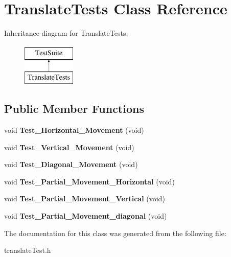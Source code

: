 \hypertarget{classTranslateTests}{\section{Translate\-Tests Class Reference}
\label{classTranslateTests}
}
Inheritance diagram for Translate\-Tests\-:\begin{figure}[H]
\begin{center}
\leavevmode
\includegraphics[height=2.000000cm]{classTranslateTests}
\end{center}
\end{figure}
\subsection*{Public Member Functions}
\begin{DoxyCompactItemize}
\item 
\hypertarget{classTranslateTests_a5b11486e0e2a66a30702efe88887eb25}{void {\bfseries Test\-\_\-\-Horizontal\-\_\-\-Movement} (void)}\label{classTranslateTests_a5b11486e0e2a66a30702efe88887eb25}

\item 
\hypertarget{classTranslateTests_a293553c0aed293861dd2860bb21277df}{void {\bfseries Test\-\_\-\-Vertical\-\_\-\-Movement} (void)}\label{classTranslateTests_a293553c0aed293861dd2860bb21277df}

\item 
\hypertarget{classTranslateTests_ae9bbcf02dc34b465790a61313ef8d872}{void {\bfseries Test\-\_\-\-Diagonal\-\_\-\-Movement} (void)}\label{classTranslateTests_ae9bbcf02dc34b465790a61313ef8d872}

\item 
\hypertarget{classTranslateTests_a4267680ef9db14133c0840c028d42a7c}{void {\bfseries Test\-\_\-\-Partial\-\_\-\-Movement\-\_\-\-Horizontal} (void)}\label{classTranslateTests_a4267680ef9db14133c0840c028d42a7c}

\item 
\hypertarget{classTranslateTests_ac50349be30fc6521f2980f5d2fe4566d}{void {\bfseries Test\-\_\-\-Partial\-\_\-\-Movement\-\_\-\-Vertical} (void)}\label{classTranslateTests_ac50349be30fc6521f2980f5d2fe4566d}

\item 
\hypertarget{classTranslateTests_aa84ca219eac252787d9dbaec404a2d1c}{void {\bfseries Test\-\_\-\-Partial\-\_\-\-Movement\-\_\-diagonal} (void)}\label{classTranslateTests_aa84ca219eac252787d9dbaec404a2d1c}

\end{DoxyCompactItemize}


The documentation for this class was generated from the following file\-:\begin{DoxyCompactItemize}
\item 
translate\-Test.\-h\end{DoxyCompactItemize}
